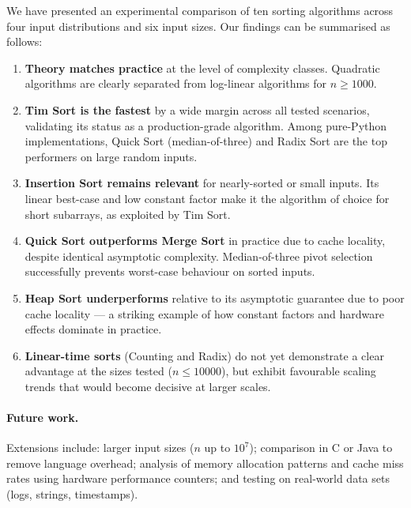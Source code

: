 \documentclass[11pt,a4paper]{article}
\begin{document}
We have presented an experimental comparison of ten sorting algorithms across four
input distributions and six input sizes.
Our findings can be summarised as follows:

\begin{enumerate}
  \item \textbf{Theory matches practice} at the level of complexity classes.
        Quadratic algorithms are clearly separated from log-linear algorithms for
        $n \geq 1000$.

  \item \textbf{Tim Sort is the fastest} by a wide margin across all tested scenarios,
        validating its status as a production-grade algorithm. Among pure-Python
        implementations, Quick Sort (median-of-three) and Radix Sort are the top
        performers on large random inputs.

  \item \textbf{Insertion Sort remains relevant} for nearly-sorted or small inputs.
        Its linear best-case and low constant factor make it the algorithm of choice
        for short subarrays, as exploited by Tim Sort.

  \item \textbf{Quick Sort outperforms Merge Sort} in practice due to cache
        locality, despite identical asymptotic complexity. Median-of-three pivot
        selection successfully prevents worst-case behaviour on sorted inputs.

  \item \textbf{Heap Sort underperforms} relative to its asymptotic guarantee due
        to poor cache locality — a striking example of how constant factors and
        hardware effects dominate in practice.

  \item \textbf{Linear-time sorts} (Counting and Radix) do not yet demonstrate a
        clear advantage at the sizes tested ($n \leq 10000$), but exhibit favourable
        scaling trends that would become decisive at larger scales.
\end{enumerate}

\paragraph{Future work.}
Extensions include: larger input sizes ($n$ up to $10^7$); comparison in C or Java to
remove language overhead; analysis of memory allocation patterns and cache miss rates
using hardware performance counters; and testing on real-world data sets (logs, strings,
timestamps).
\end{document}
